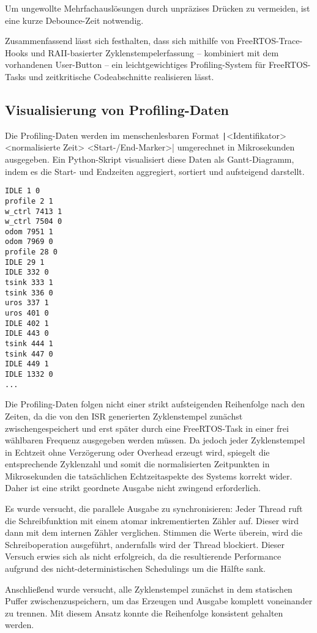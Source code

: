 Um ungewollte Mehrfachauslösungen durch unpräzises Drücken zu vermeiden, ist
eine kurze Debounce-Zeit notwendig.

Zusammenfassend lässt sich festhalten, dass sich mithilfe von
FreeRTOS-Trace-Hooks und RAII-basierter Zyklenstempelerfassung – kombiniert mit
dem vorhandenen User-Button – ein leichtgewichtiges Profiling-System für
FreeRTOS-Tasks und zeitkritische Codeabschnitte realisieren lässt.

\subsection{Visualisierung von Profiling-Daten}

Die Profiling-Daten werden im menschenlesbaren Format
\texttt|<Identifikator> <normalisierte Zeit> <Start-/End-Marker>|
umgerechnet in Mikrosekunden ausgegeben. Ein Python-Skript visualisiert diese
Daten als Gantt-Diagramm, indem es die Start- und Endzeiten aggregiert, sortiert
und aufsteigend darstellt.

\begin{code}
\begin{verbatim}
IDLE 1 0
profile 2 1
w_ctrl 7413 1
w_ctrl 7504 0
odom 7951 1
odom 7969 0
profile 28 0
IDLE 29 1
IDLE 332 0
tsink 333 1
tsink 336 0
uros 337 1
uros 401 0
IDLE 402 1
IDLE 443 0
tsink 444 1
tsink 447 0
IDLE 449 1
IDLE 1332 0
...
\end{verbatim}
\end{code}

Die Profiling-Daten folgen nicht einer strikt aufsteigenden Reihenfolge nach den
Zeiten, da die von den ISR generierten Zyklenstempel zunächst
zwischengespeichert und erst später durch eine FreeRTOS-Task in einer frei
wählbaren Frequenz ausgegeben werden müssen. Da jedoch jeder Zyklenstempel in
Echtzeit ohne Verzögerung oder Overhead erzeugt wird, spiegelt die entsprechende
Zyklenzahl und somit die normalisierten Zeitpunkten in Mikrosekunden die
tatsächlichen Echtzeitaspekte des Systems korrekt wider. Daher ist eine strikt
geordnete Ausgabe nicht zwingend erforderlich.

Es wurde versucht, die parallele Ausgabe zu synchronisieren: Jeder Thread ruft
die Schreibfunktion mit einem atomar inkrementierten Zähler auf. Dieser wird
dann mit dem internen Zähler verglichen. Stimmen die Werte überein, wird die
Schreiboperation ausgeführt, andernfalls wird der Thread blockiert. Dieser
Versuch erwies sich als nicht erfolgreich, da die resultierende Performance
aufgrund des nicht-deterministischen Schedulings um die Hälfte sank.

Anschließend wurde versucht, alle Zyklenstempel zunächst in dem statischen
Puffer zwischenzuspeichern, um das Erzeugen und Ausgabe komplett voneinander zu
trennen. Mit diesem Ansatz konnte die Reihenfolge konsistent gehalten werden.

